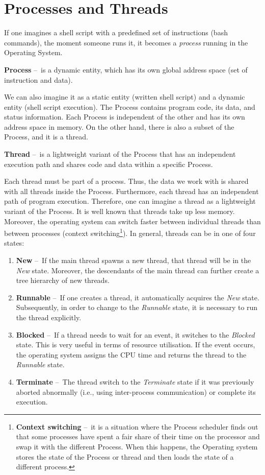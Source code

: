 \section{Processes and Threads}
\label{04:processesandthreads}

If one imagines a shell script with a predefined set of instructions (bash commands), the moment someone runs it, it becomes a \emph{process} running in the Operating System.
\begin{definition}
    \textbf{Process} \---\ is a dynamic entity, which has its own global address space (set of instruction and data).
\end{definition}
We can also imagine it as a static entity (written shell script) and a dynamic entity (shell script execution).
The Process contains program code, its data, and status information.
Each Process is independent of the other and has its own address space in memory.
On the other hand, there is also a subset of the Process, and it is a thread.
\begin{definition}
    \textbf{Thread} \---\ is a lightweight variant of the Process that has an independent execution path and shares code and data within a specific Process.
\end{definition}
Each thread must be part of a process.
Thus, the data we work with is shared with all threads inside the Process.
Furthermore, each thread has an independent path of program execution.
Therefore, one can imagine a thread as a lightweight variant of the Process.
It is well known that threads take up less memory.
Moreover, the operating system can switch faster between individual threads than between processes (context switching\footnote {\textbf{Context switching} \---\ it is a situation where the Process scheduler finds out that some processes have spent a fair share of their time on the processor and swap it with the different Process. When this happens, the Operating system stores the state of the Process or thread and then loads the state of a different process.}). In general, threads can be in one of four states:
\begin{enumerate}[itemsep=1mm, parsep=0pt]
    \item \textbf{New} \---\ If the main thread spawns a new thread, that thread will be in the \emph{New} state.
    Moreover, the descendants of the main thread can further create a tree hierarchy of new threads.
    \item \textbf{Runnable} \---\ If one creates a thread, it automatically acquires the \emph{New} state.
    Subsequently, in order to change to the \emph{Runnable} state, it is necessary to run the thread explicitly.
    \item \textbf {Blocked} \---\ If a thread needs to wait for an event, it switches to the \emph{Blocked} state.
    This is very useful in terms of resource utilisation. If the event occurs, the operating system assigns the CPU time and returns the thread to the \emph{Runnable} state.
    \item \textbf{Terminate} \---\ The thread switch to the \emph {Terminate} state if it was previously aborted abnormally (i.e., using inter-process communication) or complete its execution.
\end{enumerate}

